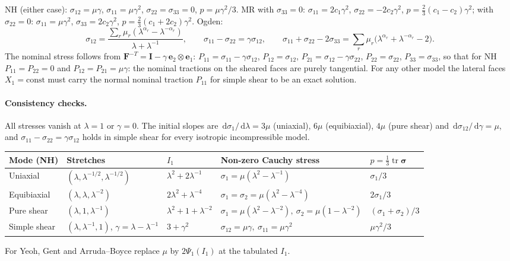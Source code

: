 \documentclass[11pt]{article}
\newcommand{\ud}{\,\mathrm{d}}
\newcommand{\tr}{\operatorname{tr}}
\newcommand{\be}{\bm{e}}
\newcommand{\bsig}{\bm{\sigma}}
\newcommand{\bF}{\bm{F}}
\newcommand{\bI}{\bm{I}}
\newcommand{\Pone}{\Psi_{1}}
\newcommand{\Ione}{I_1}
\begin{document}
NH (either case): $\sigma_{12} = \mu\gamma$, $\sigma_{11} = \mu\gamma^2$,
$\sigma_{22} = \sigma_{33} = 0$, $p = \mu\gamma^2/3$.  MR with
$\sigma_{33} = 0$: $\sigma_{11} = 2c_1\gamma^2$, $\sigma_{22} = -2c_2\gamma^2$,
$p = \tfrac23(c_1 - c_2)\gamma^2$; with $\sigma_{22} = 0$:
$\sigma_{11} = \mu\gamma^2$, $\sigma_{33} = 2c_2\gamma^2$,
$p = \tfrac23(c_1 + 2c_2)\gamma^2$.  Ogden:
\begin{equation}
  \sigma_{12} = \frac{\sum_r\mu_r(\lambda^{\alpha_r} - \lambda^{-\alpha_r})}{\lambda + \lambda^{-1}}, \qquad
  \sigma_{11} - \sigma_{22} = \gamma\sigma_{12}, \qquad
  \sigma_{11} + \sigma_{22} - 2\sigma_{33} = \sum_r\mu_r\bigl(\lambda^{\alpha_r} + \lambda^{-\alpha_r} - 2\bigr).
\end{equation}
The nominal stress follows from $\bF^{-T} = \bI - \gamma\,\be_2\otimes\be_1$:
$P_{11} = \sigma_{11} - \gamma\sigma_{12}$, $P_{12} = \sigma_{12}$,
$P_{21} = \sigma_{12} - \gamma\sigma_{22}$, $P_{22} = \sigma_{22}$,
$P_{33} = \sigma_{33}$, so that for NH $P_{11} = P_{22} = 0$ and
$P_{12} = P_{21} = \mu\gamma$: the nominal tractions on the sheared faces are
purely tangential.  For any other model the lateral faces
$X_1 = \text{const}$ must carry the normal nominal traction $P_{11}$ for
simple shear to be an exact solution.

\paragraph{Consistency checks.}
All stresses vanish at $\lambda = 1$ or $\gamma = 0$.  The initial slopes
are $\ud\sigma_1/\ud\lambda = 3\mu$ (uniaxial), $6\mu$ (equibiaxial), $4\mu$
(pure shear) and $\ud\sigma_{12}/\ud\gamma = \mu$, and
$\sigma_{11} - \sigma_{22} = \gamma\sigma_{12}$ holds in simple shear for every
isotropic incompressible model.
\begin{center}
\footnotesize
\setlength{\tabcolsep}{4pt}
\renewcommand{\arraystretch}{1.4}
\begin{tabular}{@{}l l l l l@{}}
\toprule
Mode (NH) & Stretches & $\Ione$ & Non-zero Cauchy stress & $p = \tfrac13\tr\bsig$ \\
\midrule
Uniaxial & $(\lambda, \lambda^{-1/2}, \lambda^{-1/2})$ & $\lambda^2 + 2\lambda^{-1}$ &
  $\sigma_1 = \mu(\lambda^2 - \lambda^{-1})$ & $\sigma_1/3$ \\
Equibiaxial & $(\lambda, \lambda, \lambda^{-2})$ & $2\lambda^2 + \lambda^{-4}$ &
  $\sigma_1 = \sigma_2 = \mu(\lambda^2 - \lambda^{-4})$ & $2\sigma_1/3$ \\
Pure shear & $(\lambda, 1, \lambda^{-1})$ & $\lambda^2 + 1 + \lambda^{-2}$ &
  $\sigma_1 = \mu(\lambda^2 - \lambda^{-2}),\ \sigma_2 = \mu(1 - \lambda^{-2})$ & $(\sigma_1 + \sigma_2)/3$ \\
Simple shear & $(\lambda, \lambda^{-1}, 1)$, $\gamma = \lambda - \lambda^{-1}$ & $3 + \gamma^2$ &
  $\sigma_{12} = \mu\gamma,\ \sigma_{11} = \mu\gamma^2$ & $\mu\gamma^2/3$ \\
\bottomrule
\end{tabular}
\end{center}
For Yeoh, Gent and Arruda--Boyce replace $\mu$ by $2\Pone(\Ione)$ at the
tabulated $\Ione$.
\end{document}

